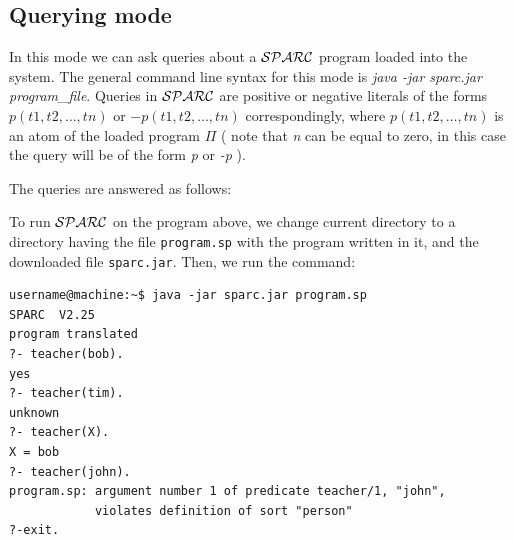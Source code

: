 \documentclass[12pt, letterpaper]{article}
\begin{document}
\subsection{Querying mode}

In this mode we can ask queries about a ${\cal SPARC}$ program loaded into the system.
The general command line syntax for this mode is \textit{java -jar sparc.jar program\_file}.
Queries in ${\cal SPARC}$ are positive or negative literals of the forms $p(t1,t2,\dots,tn)$ or
$-p(t1,t2,\dots,tn)$ correspondingly, where $p(t1,t2,\dots,tn)$  is an atom of the loaded program $\Pi$ 
( note that \textit{n} can be equal to zero, in this case the query will be of the form \textit{p} or \textit{-p}  ).

The queries are answered as follows:

To run  ${\cal SPARC}$  on the program above, 
we change current directory to a directory having the file \texttt{program.sp} with the program written in it, and the downloaded file \texttt{sparc.jar}.  Then, we run the command:
\begin{verbatim}
username@machine:~$ java -jar sparc.jar program.sp
SPARC  V2.25
program translated
?- teacher(bob).
yes
?- teacher(tim).
unknown
?- teacher(X).
X = bob
?- teacher(john).
program.sp: argument number 1 of predicate teacher/1, "john", 
            violates definition of sort "person"
?-exit.
\end{verbatim}
\end{document}
